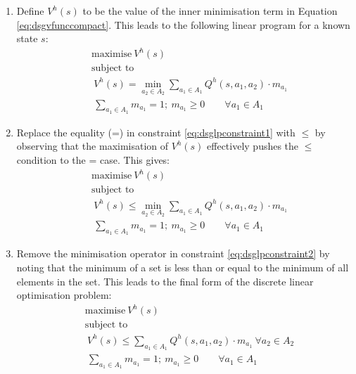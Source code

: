 \begin{enumerate}
  \item Define {\small $V^h(s)$ } to be the value of the inner minimisation term in
            Equation \eqref{eq:dsgvfunccompact}. This leads to the following linear program for a known state $s$:
{\small
\begin{subequations}
\begin{align}
&\text{maximise}   \  V^{h}(s) \nonumber \\
&\text{subject to}   \nonumber \\
&\  V^{h}(s) = \min_{a_2 \in A_2} \sum_{a_1 \in A_1} Q^{h}(s, a_1, a_2) \cdot m_{a_{1}} \label{eq:dsglpconstraint1} \\
                          &\  \sum_{a_{1} \in A_1} m_{a_{1}} = 1 ; \  m_{a_{1}} \geq 0 \qquad \forall a_{1} \in A_1 \nonumber
\end{align}
\end{subequations}
}%

  \item Replace the equality (=) in constraint \eqref{eq:dsglpconstraint1} with
  $\leq$ by observing that the maximisation of {\small $V^{h}(s)$}  effectively pushes the $\leq$ condition to the = case. This gives: 
{\small 
\begin{subequations}
\begin{align}
&\text{maximise}   \  V^{h}(s) \nonumber \\
&\text{subject to}   \nonumber \\
&\  V^{h}(s) \leq \min_{a_2 \in A_2} \sum_{a_1 \in A_1} Q^{h}(s, a_1, a_2) \cdot m_{a_{1}} \label{eq:dsglpconstraint2} \\
                          &\  \sum_{a_{1} \in A_1} m_{a_{1}} = 1 ; \  m_{a_{1}} \geq 0 \qquad \forall a_{1} \in A_1 \nonumber
\end{align}
\end{subequations}
}%
  
  \item Remove the minimisation operator in constraint \eqref{eq:dsglpconstraint2}
            by noting that the minimum of a set is less than or equal to the minimum of all elements in the set.
            This leads to the final form of the discrete linear optimisation problem:
{\small 
\begin{align*}
&\text{maximise}   \  V^{h}(s) \nonumber \\
&\text{subject to}   \nonumber \\
&\  V^{h}(s) \leq \sum_{a_1 \in A_1} Q^{h}(s, a_1, a_2) \cdot m_{a_{1}} \ \forall a_2 \in A_2\\
                          &\  \sum_{a_{1} \in A_1} m_{a_{1}} = 1 ; \  m_{a_{1}} \geq 0 \qquad \forall a_{1} \in A_1 \nonumber
\end{align*}
}%
\end{enumerate}

